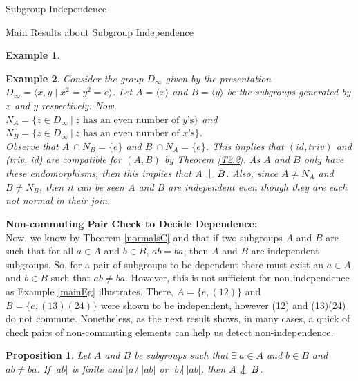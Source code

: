 \documentclass{article}
\newtheorem{proposition}{Proposition}[section]
\newtheorem{example}{Example}[section]
\def\indep{\mathrel{\raise0.2ex\hbox{\ooalign{\hidewidth$\vert$\hidewidth\cr\raise-0.9ex\hbox{$\smile$}}}}}
\begin{document}
\begin{section}{Subgroup Independence}
\begin{subsection}{Main Results about Subgroup Independence}
\begin{example}
				
				
			\end{example}
			
			\begin{example}\label{ZalansFavourite}
				\normalfont
				Consider the group $D_{\infty}$ given by the presentation $D_{\infty} = \langle  x, y \mid x^2=y^2=e\rangle $. Let $A = \langle x\rangle $ and $B = \langle y\rangle $ be the 
				subgroups generated  by $x$ and $y$ respectively. Now, \\
				
				\noindent $N_A  = \{z \in D_{\infty} \ | \ z \text{ has an  even number of $y$'s} \}$ and \\
				$N_B  = \{z \in D_{\infty} \ | \ z \text{ has  an even number of $x$'s} \}$.\\
				
				\noindent Observe that $A \  \cap N_B  = \{e\}$ and  $B \  \cap N_A  = \{e\}$. This implies that $(id, triv)$ and (triv, id) are compatible for $(A, B)$ by Theorem \ref {T2.2}.  As $A$ and $B$ only have these endomorphisms, then this implies that  $A \indep B$. Also, since $A \not= N_A $ and $B \not = N_B $, then it can  be seen $A$ and $B$ are independent even though they are each not normal in their join.
				
			\end{example}
			
			
			\noindent \textbf{Non-commuting Pair Check to Decide Dependence:}\\
			
			Now, we know by Theorem \ref{normalsC} and that if two subgroups $A$ and $B$ are such that for all $a \in A$ and $b \in B$, $ab=ba$, then $A$ and $B$  are independent subgroups. So, for a pair of subgroups to be dependent there must exist an $ a \in A$ and $b \in B$ such that $ab \not= ba$. However, this is not sufficient for non-independence as Example \ref{mainEg} illustrates. There, $A = \{e, (12)\}$ and $B = \{e, (13)(24)\}$ were shown to be independent, however (12) and (13)(24) do not commute. Nonetheless, as the next result shows, in many cases, a quick of check pairs of non-commuting elements can help us detect non-independence.
			
			
			
			\begin{proposition}\label{OrderTheorem}
				Let $A$ and $B$ be subgroups such that $\exists \ a \in A$ and $b \in B$ and $ab \not=ba$. If $|ab|$ is finite and   $|a| \not | \ |ab|$ or $|b| \not | \ |ab|$, then $A \not \indep B$.
			\end{proposition}
			

\end{subsection}
\end{section}
\end{document}
